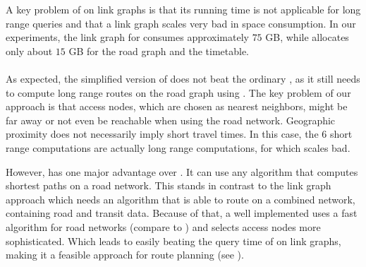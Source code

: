 	A key problem of \dijkstra on link graphs is that its running time is not applicable for long range queries and that a link graph scales
	very bad in space consumption. In our experiments, the link graph for \switzerlandR consumes approximately $75$ GB, while \anr allocates
	only about $15$ GB for the road graph and the timetable.\\\\
	As expected, the simplified version of \anr does not beat the ordinary \dijkstra, as it still needs to compute long range routes on the road graph
	using \dijkstra. The key problem of our approach is that access nodes, which are chosen as nearest neighbors, might be far away or not even
	be reachable when using the road network. Geographic proximity does not necessarily imply short travel times.
	In this case, the $6$ short range \dijkstra computations are actually long range computations, for which \dijkstra scales bad.
	
	However, \anr has one major advantage over \dijkstra. It can use any algorithm that computes shortest paths on a road network.
	This stands in contrast to the link graph approach which needs an algorithm that is able to route on a combined network, containing
	road and transit data. Because of that, a well implemented \anr uses a fast algorithm for road networks
	(compare to ) and selects access nodes more sophisticated. Which leads
	to \anr easily beating the query time of \dijkstra on link graphs, making it a feasible approach for \multiModal route planning
	(see ).